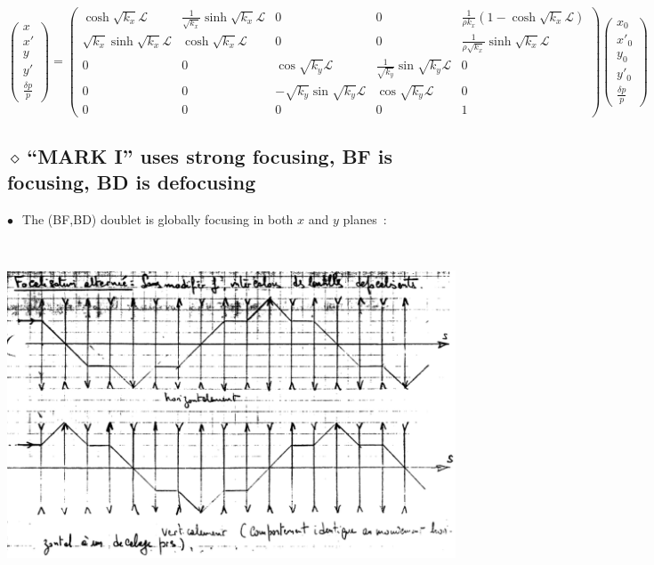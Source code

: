 \documentclass[12pt]{article}
\newcommand{\nib}{\noindent \ensuremath{\bullet~}}
\newcommand{\nid}{\noindent \ensuremath{\diamond~}}
\begin{document}
{ 
{%
$$\left(
\begin{array}{ccccc} x \\ x' \\ y \\ y' \\ \frac{\textstyle{\delta p}}{\textstyle{p}} 
\end{array} 
\right)
\! = \!
\left(
\begin{array}{ccccc} 
 \cosh \sqrt{k_x} \mathcal{L} & \frac{\textstyle{1}}{\textstyle{\sqrt{k_x}}}  \sinh \sqrt{k_x}  \mathcal{L}  
 & 0& 0 & \frac{\textstyle{1}}{\textstyle{\rho k_x}}(1 - \cosh \sqrt{k_x} \mathcal{L} ) \\[-.4000ex]
 \sqrt{k_x} \sinh \sqrt{k_x}  \mathcal{L} 
&   \cosh \sqrt{k_x}  \mathcal{L} 
 & 0 & 0 & \frac{\textstyle{1}}{\textstyle{\rho \sqrt{k_x}}}\sinh \sqrt{k_x} \mathcal{L} \\[-.4000ex]
0 & 0 &  \cos \sqrt{k_y} \mathcal{L} & \frac{\textstyle{1}}{\textstyle{ \sqrt{k_y}}}  \sin \sqrt{k_y}  \mathcal{L} & 0 \\ [-.4000ex]
0 & 0 &  -\sqrt{k_y} \sin \sqrt{k_y}  \mathcal{L} &  \cos \sqrt{k_y}  \mathcal{L} & 0  \\[-.4000ex]
0 & 0 & 0 & 0 & 1 
\end{array} \right)
\left(
\begin{array}{ccccc} x_0 \\ x'_0 \\ y_0  \\ y'_0  \\ \frac{\textstyle{\delta p}}{\textstyle{p}} 
\end{array} 
\right)$$
}




\clearpage 

\subsection*{\LARGE \nid ``MARK I'' uses strong focusing,  BF is focusing, BD is defocusing }


\nib\ The (BF,BD) doublet is globally  focusing  in both  $x$ and $y$ planes~: 

~

\begin{center}
\includegraphics*[width=0.9\linewidth]{./figs_FFAG_introSlides/focAlternee.eps}
\end{center}

}
\end{document}
